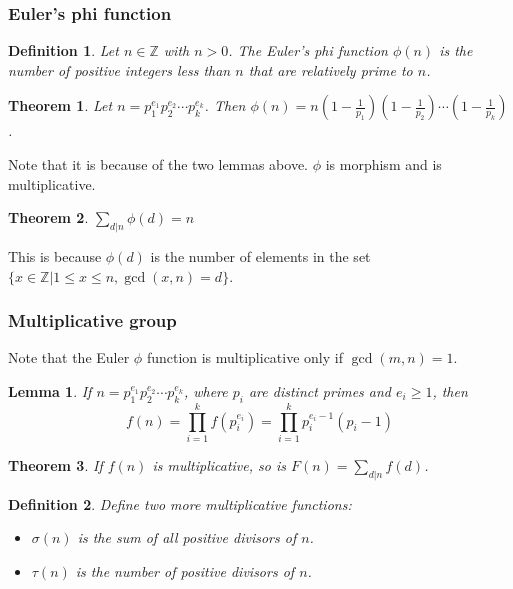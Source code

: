\documentclass[letterpaper,12pt,oneside]{article}
\newtheorem{theorem}{Theorem}
\newtheorem{definition}{Definition}
\newtheorem*{lemma}{Lemma}
\begin{document}
\subsubsection{Euler's phi function}
\begin{definition}
    Let $n\in \mathbb{Z}$ with $n>0$. The Euler's phi function $\phi(n)$ is the number of positive integers less than $n$ that are relatively prime to $n$.
\end{definition}
\begin{theorem}
    Let $n = p_1^{e_1}p_2^{e_2}\cdots p_k^{e_k}$. Then $\phi(n) = n(1-\frac{1}{p_1})(1-\frac{1}{p_2})\cdots (1-\frac{1}{p_k})$.
\end{theorem}
Note that it is because of the two lemmas above. $\phi$ is morphism and is multiplicative.
\begin{theorem}
    $\sum_{d|n} \phi(d) = n$
\end{theorem}
This is because $\phi(d)$ is the number of elements in the set $\{x\in \mathbb{Z}|1\leq x\leq n, \gcd(x,n) = d\}$.
\subsubsection{Multiplicative group}
Note that the Euler $\phi$ function is multiplicative only if $\gcd(m,n) = 1$. 

\begin{lemma}
    If $n = p_1^{e_1}p_2^{e_2}\cdots p_k^{e_k}$, where $p_i$ are distinct primes and $e_i\geq 1$, then \[
        f(n) = \prod_{i=1}^k f(p_i^{e_i}) = \prod_{i=1}^k p_i^{e_i-1}(p_i-1)
    \]
\end{lemma}

\begin{theorem}
    If $f(n)$ is multiplicative, so is $F(n) = \sum_{d|n} f(d)$.
\end{theorem}

\begin{definition}
    Define two more multiplicative functions:\begin{itemize}
        \item $\sigma(n)$ is the sum of all positive divisors of $n$.
        \item $\tau(n)$ is the number of positive divisors of $n$.
    \end{itemize}
\end{definition}
\end{document}
